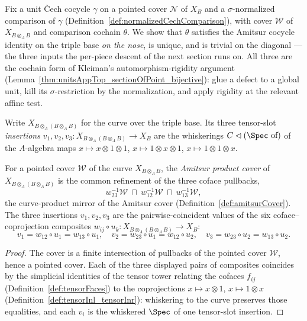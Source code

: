 Fix a unit \v Cech cocycle \(\gamma\) on a pointed cover \(\mathcal N\) of \(X_B\) and a
\(\sigma\)-normalized comparison of \(\gamma\)
(Definition~\ref{def:normalizedCechComparison}), with cover \(\mathcal W\) of \(X_{B \otimes_A B}\)
and comparison cochain \(\theta\). We show that \(\theta\) satisfies the Amitsur cocycle identity on
the triple base \emph{on the nose}, is unique, and is trivial on the diagonal --- the three
inputs the per-piece descent of the next section runs on. All three are the cochain form of
Kleiman's automorphism-rigidity argument (Lemma~\ref{thm:unitsAppTop_sectionOfPoint_bijective}):
glue a defect to a global unit, kill its \(\sigma\)-restriction by the normalization, and apply
rigidity at the relevant affine test.

Write \(X_{B \otimes_A (B \otimes_A B)}\) for the curve over the triple base. Its three
tensor-slot \emph{insertions} \(v_1, v_2, v_3 \colon X_{B \otimes_A (B \otimes_A B)} \to X_B\) are
the whiskerings \(C \lhd (\Spec\ \text{of})\) of the \(A\)-algebra maps \(x \mapsto x \otimes 1
\otimes 1\), \(x \mapsto 1 \otimes x \otimes 1\), \(x \mapsto 1 \otimes 1 \otimes x\).

\begin{definition}
  \label{def:amitsurProductCover}
  \leanok
  For a pointed cover \(\mathcal W\) of the curve \(X_{B \otimes_A B}\), the \emph{Amitsur product
  cover} of \(X_{B \otimes_A (B \otimes_A B)}\) is the common refinement of the three coface
  pullbacks,
  \[
    w_{23}^{-1}\mathcal W \ \sqcap\ w_{12}^{-1}\mathcal W \ \sqcap\ w_{13}^{-1}\mathcal W ,
  \]
  the curve-product mirror of the Amitsur cover (Definition~\ref{def:amitsurCover}). The three
  insertions \(v_1, v_2, v_3\) are the pairwise-coincident values of the six coface--coprojection
  composites \(w_{ij} \circ u_k \colon X_{B \otimes_A (B \otimes_A B)} \to X_B\):
  \[
    v_1 = w_{12} \circ u_1 = w_{13} \circ u_1, \quad
    v_2 = w_{23} \circ u_1 = w_{12} \circ u_2, \quad
    v_3 = w_{23} \circ u_2 = w_{13} \circ u_2 .
  \]
\end{definition}
\begin{proof}
  \leanok
  The cover is a finite intersection of pullbacks of the pointed cover \(\mathcal W\), hence a
  pointed cover. Each of the three displayed pairs of composites coincides by the simplicial
  identities of the tensor tower relating the cofaces \(f_{ij}\) (Definition~\ref{def:tensorFaces})
  to the coprojections \(x \mapsto x \otimes 1\), \(x \mapsto 1 \otimes x\)
  (Definition~\ref{def:tensorInl_tensorInr}): whiskering to the curve preserves those equalities,
  and each \(v_i\) is the whiskered \(\Spec\) of one tensor-slot insertion.
\end{proof}


